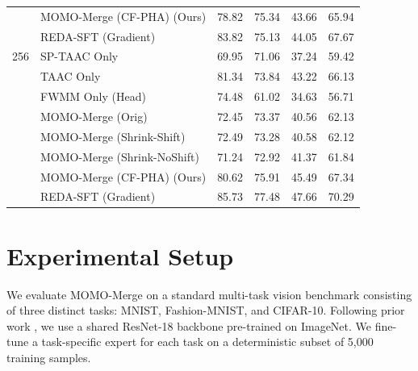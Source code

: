 \documentclass{article}
\theoremstyle{plain}
\theoremstyle{definition}
\theoremstyle{remark}
\begin{document}
\begin{table}[t]
\begin{center}
\begin{small}
\begin{sc}
\begin{tabular}{llcccc}
& MOMO-Merge (CF-PHA) (Ours) & 78.82 & 75.34 & 43.66 & 65.94 \\
& REDA-SFT (Gradient) & 83.82 & 75.13 & 44.05 & 67.67 \\
\midrule
256 & SP-TAAC Only & 69.95 & 71.06 & 37.24 & 59.42 \\
& TAAC Only & 81.34 & 73.84 & 43.22 & 66.13 \\
& FWMM Only (Head) & 74.48 & 61.02 & 34.63 & 56.71 \\
& MOMO-Merge (Orig) & 72.45 & 73.37 & 40.56 & 62.13 \\
& MOMO-Merge (Shrink-Shift) & 72.49 & 73.28 & 40.58 & 62.12 \\
& MOMO-Merge (Shrink-NoShift) & 71.24 & 72.92 & 41.37 & 61.84 \\
& MOMO-Merge (CF-PHA) (Ours) & 80.62 & 75.91 & 45.49 & 67.34 \\
& REDA-SFT (Gradient) & 85.73 & 77.48 & 47.66 & 70.29 \\
\bottomrule
\end{tabular}
\end{sc}
\end{small}
\end{center}
\vskip -0.1in
\end{table}

\section{Experimental Setup}
\label{sec:setup}

We evaluate MOMO-Merge on a standard multi-task vision benchmark consisting of three distinct tasks: MNIST, Fashion-MNIST, and CIFAR-10. Following prior work \cite{REDA26, SPTAAC26}, we use a shared ResNet-18 backbone pre-trained on ImageNet. We fine-tune a task-specific expert for each task on a deterministic subset of 5,000 training samples.
\end{document}

